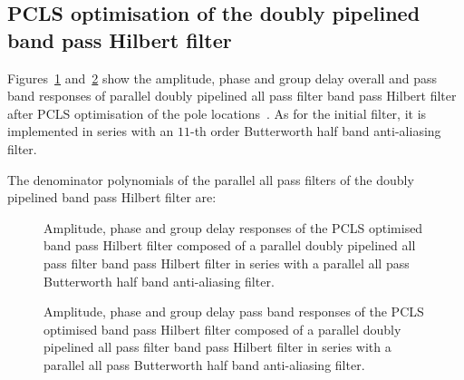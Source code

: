 \documentclass[a4paper,twoside,10pt,english]{article}
\newcommand{\DesignOfSchurLatticeFiltersPdfScale}{1}
\begin{document}
\subsection{PCLS optimisation of the doubly pipelined band pass Hilbert filter}
Figures~\ref{fig:parallel-allpass-band-pass-Hilbert-R2-pcls}
and~\ref{fig:parallel-allpass-band-pass-Hilbert-R2-pcls-pass} show the
amplitude, phase and group delay overall and pass band responses of parallel
doubly pipelined all pass filter band pass Hilbert filter after PCLS
optimisation of the pole locations~\cite{Deczky_MinPSynthesisIIRDigitalFilters,
  Richards_DeczkyRecursiveDecimator}. As for the initial filter, it is
implemented in series with an $11$-th order Butterworth half band anti-aliasing
filter. 

The denominator polynomials of the parallel all pass filters of the
doubly pipelined band pass Hilbert filter are:
\begin{small}


\end{small}

\begin{figure}
\centering
\scalebox{\DesignOfSchurLatticeFiltersPdfScale}{}
\caption{Amplitude, phase and group delay responses of the PCLS optimised
  band pass Hilbert filter composed of a parallel doubly pipelined all pass
  filter band pass Hilbert filter in series with a parallel all pass Butterworth
  half band anti-aliasing filter.}
\label{fig:parallel-allpass-band-pass-Hilbert-R2-pcls}
\end{figure}

\begin{figure}
\centering
\scalebox{\DesignOfSchurLatticeFiltersPdfScale}{}
\caption{Amplitude, phase and group delay pass band responses of the PCLS
  optimised band pass Hilbert filter composed of a parallel doubly pipelined all
  pass filter band pass Hilbert filter in series with a parallel all pass
  Butterworth half band anti-aliasing filter.}
\label{fig:parallel-allpass-band-pass-Hilbert-R2-pcls-pass}
\end{figure}
\end{document}
